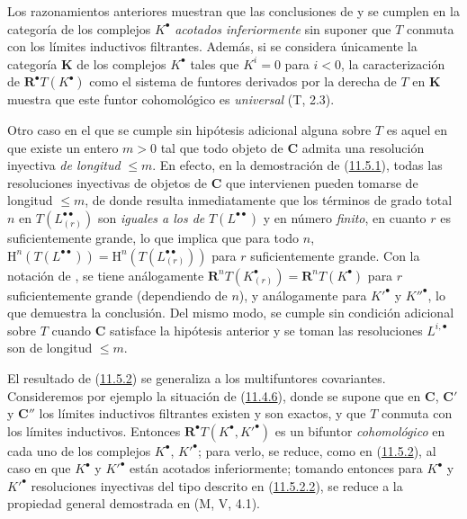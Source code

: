 \begin{remark}[11.5.4]
\label{0.11.5.4}
\label{0.11.5.4-fr}
Los razonamientos anteriores muestran que las conclusiones de  y  se cumplen en la categoría de los complejos $K^\bullet$ \emph{acotados inferiormente} sin suponer que $T$ conmuta con los límites inductivos filtrantes.
Además, si se considera únicamente la categoría $\boldsymbol{K}$ de los complejos $K^\bullet$ tales que $K^i=0$ para $i<0$, la caracterización de $\mathbf R^\bullet T(K^\bullet)$ como el sistema de funtores derivados por la derecha de $T$ en $\boldsymbol{K}$ muestra que este funtor cohomológico es \emph{universal} (T, 2.3).

Otro caso en el que  se cumple sin hipótesis adicional alguna sobre $T$ es aquel en que existe un entero $m>0$ tal que todo objeto de $\boldsymbol{C}$ admita una resolución inyectiva \emph{de longitud} $\leq m$. En efecto, en la demostración de (\hyperref[0.11.5.1-fr]{11.5.1}), todas las resoluciones inyectivas de objetos de $\boldsymbol{C}$ que intervienen pueden tomarse de longitud $\leq m$, de donde resulta inmediatamente que los términos de grado total $n$ en $T(L_{(r)}^{\bullet\bullet})$ son \emph{iguales a los de} $T(L^{\bullet\bullet})$ y en número \emph{finito}, en cuanto $r$ es suficientemente grande, lo que
implica que para todo $n$,
$\mathrm H^n(T(L^{\bullet\bullet}))=
\mathrm H^n(T(L_{(r)}^{\bullet\bullet}))$
para $r$ suficientemente grande.
Con la notación de , se tiene análogamente
$\mathbf R^nT(K_{(r)}^\bullet)=\mathbf R^nT(K^\bullet)$
para $r$ suficientemente grande (dependiendo de $n$), y análogamente para $K'^\bullet$ y $K''^\bullet$, lo que demuestra la conclusión.
Del mismo modo,  se cumple sin condición adicional sobre $T$ cuando $\boldsymbol{C}$ satisface la hipótesis anterior y se toman las resoluciones $L^{i,\bullet}$ son de longitud $\leq m$.
\end{remark}

\begin{env}[11.5.5]
\label{0.11.5.5-fr}
El resultado de (\hyperref[0.11.5.2-fr]{11.5.2}) se generaliza a los multifuntores covariantes. Consideremos por ejemplo la situación de (\hyperref[0.11.4.6-fr]{11.4.6}), donde se supone que en $\boldsymbol{C}$, $\boldsymbol{C}'$ y $\boldsymbol{C}''$
los límites inductivos filtrantes existen y son exactos, y que $T$ conmuta con los límites inductivos. Entonces $\mathbf R^\bullet T(K^\bullet,K'^\bullet)$ es un bifuntor \emph{cohomológico} en cada uno de los complejos $K^\bullet$, $K'^\bullet$; para verlo, se reduce, como en (\hyperref[0.11.5.2-fr]{11.5.2}), al caso en que $K^\bullet$ y $K'^\bullet$ están acotados inferiormente; tomando entonces para $K^\bullet$ y $K'^\bullet$ resoluciones inyectivas del tipo descrito en (\hyperref[0.11.5.2.2-fr]{11.5.2.2}), se reduce a la propiedad general demostrada en (M, V, 4.1).
\end{env}

